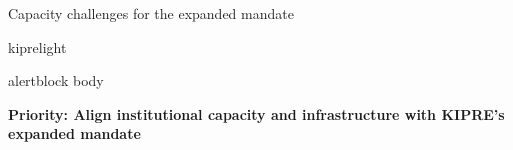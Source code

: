 \documentclass[aspectratio=169,11pt]{beamer}
\begin{document}
\begin{frame}{Capacity challenges for the expanded mandate}
\begin{beamercolorbox}[
    wd=\textwidth,
    sep=0.13cm,
    rounded=true
]{kiprelight}
\end{beamercolorbox}

\vspace{0.18cm}


\begin{beamercolorbox}[
    wd=\textwidth,
    sep=0.14cm,
    rounded=true
]{alertblock body}

\centering
{\large
\textbf{Priority: Align institutional capacity and infrastructure with KIPRE's expanded mandate}
}

\end{beamercolorbox}

\end{frame}
\end{document}
